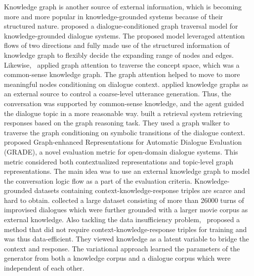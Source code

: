 Knowledge graph is another source of external information, which is becoming more and more popular in knowledge-grounded systems because of their structured nature.  proposed a dialogue-conditioned graph traversal model for knowledge-grounded dialogue systems. The proposed model leveraged attention flows of two directions and fully made use of the structured information of knowledge graph to flexibly decide the expanding range of nodes and edges. Likewise,~ applied graph attention to traverse the concept space, which was a common-sense knowledge graph. The graph attention helped to move to more meaningful nodes conditioning on dialogue context.  applied knowledge graphs as an external source to control a coarse-level utterance generation. Thus, the conversation was supported by common-sense knowledge, and the agent guided the dialogue topic in a more reasonable way.  built a retrieval system retrieving responses based on the graph reasoning task. They used a graph walker to traverse the graph conditioning on symbolic transitions of the dialogue context.  proposed Graph-enhanced Representations for Automatic Dialogue Evaluation (GRADE), a novel evaluation metric for open-domain dialogue systems. This metric considered both contextualized representations and topic-level graph representations. The main idea was to use an external knowledge graph to model the conversation logic flow as a part of the evaluation criteria. 
Knowledge-grounded datasets containing context-knowledge-response triples are scarce and hard to obtain.  collected a large dataset consisting of more than 26000 turns of improvised dialogues which were further grounded with a larger movie corpus as external knowledge. Also tackling the data insufficiency problem,~ proposed a method that did not require context-knowledge-response triples for training and was thus data-efficient. They viewed knowledge as a latent variable to bridge the context and response. The variational approach learned the parameters of the generator from both a knowledge corpus and a dialogue corpus which were independent of each other.

